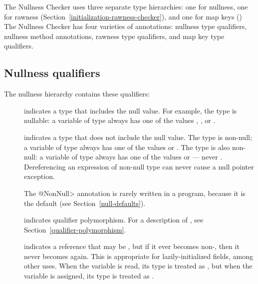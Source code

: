 The Nullness Checker uses three separate type hierarchies:  one for nullness,
one for rawness (Section~\ref{initialization-rawness-checker}),
and one for map keys ()
The Nullness Checker has four varieties of annotations:  nullness
type qualifiers, nullness method annotations, rawness type qualifiers, and
map key type
qualifiers.

\subsection{Nullness qualifiers\label{nullness-qualifiers}}

The nullness hierarchy contains these qualifiers:

\begin{description}

\item[]
  indicates a type that includes the null value.  For example, the type 
  is nullable:  a variable of type  always has one of the
  values , , or .

\item[]
  indicates a type that does not include the null value.  The type
   is non-null; a variable of type  always has
  one of the values  or .  The type  is also non-null:  a variable of type 
  always has one of the values  or  --- never
  .  Dereferencing an expression of non-null type can never cause
  a null pointer exception.

  The \<@NonNull> annotation is rarely written in a program, because it is
  the default (see Section~\ref{null-defaults}).

\item[]
  indicates qualifier polymorphism.  For a description of
  , see
  Section~\ref{qualifier-polymorphism}.

\item[]
  indicates a reference that may be , but if it ever becomes
  non-, then it never becomes  again.  This is
  appropriate for lazily-initialized fields, among other uses.  When the
  variable is read, its type is treated as
  , but when the variable is
  assigned, its type is treated as
  .


\end{description}
